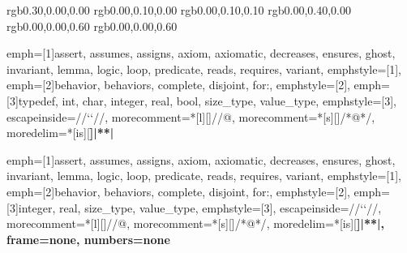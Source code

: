 
\usepackage{courier} 
\usepackage{listings}
\usepackage{color} 


\makeatletter
\renewcommand\lstinline[1][]{%
  \leavevmode\bgroup %
  \def\lst@boxpos{b}%
  \lsthk@PreSet\lstset{flexiblecolumns,#1}%
  \lsthk@TextStyle
  \ifnum\iffalse{\fi`}=\z@\fi
  \@ifnextchar\bgroup{%
  \ifnum`{=\z@}\fi%
  \afterassignment\lst@InlineG \let\@let@token}{%
  \ifnum`{=\z@}\fi\lstinline@}}
\makeatother

% 1.3.10 jb:
% commented-out unused colors and styles,
% changed color names to logical ones

%\definecolor{darkred}		{rgb}{0.60,0.00,0.00}
\definecolor{coACSLBehavior}	{rgb}{0.30,0.00,0.00}
\definecolor{coASCL}		{rgb}{0.00,0.10,0.00}
\definecolor{coASCLKeyword}	{rgb}{0.00,0.10,0.10}
\definecolor{darkgreen}		{rgb}{0.00,0.40,0.00}
\definecolor{darkblue}		{rgb}{0.00,0.00,0.60}
\definecolor{coCKeyword}	{rgb}{0.00,0.00,0.60}
%\definecolor{red}		{rgb}{0.98,0.00,0.00}
%\definecolor{lightblue}        {rgb}{0.60,0.80,1.00}
%\definecolor{lightred}		{rgb}{1.00,0.60,0.60}

{
  emph=[1]{assert, assumes, assigns, axiom, axiomatic, decreases, ensures,
                 ghost, invariant, lemma, logic, loop, predicate,
		 reads, requires, variant},
  emphstyle=[1]{\bfseries\color{coASCLKeyword}},
  emph=[2]{behavior, behaviors, complete, disjoint, for:},
  emphstyle=[2]{\bfseries\color{coACSLBehavior}},
  emph=[3]{typedef, int, char, integer, real, bool, size_type, value_type},
  emphstyle=[3]{\bfseries\color{coCKeyword}},
  escapeinside={//`}{`//},
  morecomment=*[l][\color{coASCL}]{//@},
  morecomment=*[s][\color{coASCL}]{/*@}{*/},
  moredelim=*[is][\bfseries]{|*}{*|}
  }

{
  emph=[1]{assert, assumes, assigns, axiom, axiomatic, decreases, ensures,
                 ghost, invariant, lemma, logic, loop, predicate,
		 reads, requires, variant},
  emphstyle=[1]{\bfseries\color{coASCLKeyword}},
  emph=[2]{behavior, behaviors, complete, disjoint, for:},
  emphstyle=[2]{\bfseries\color{coACSLBehavior}},
  emph=[3]{integer, real, size_type, value_type},
  emphstyle=[3]{\bfseries\color{coCKeyword}},
  escapeinside={//`}{`//},
  morecomment=*[l][\color{coASCL}]{//@},
  morecomment=*[s][\color{coASCL}]{/*@}{*/},
  moredelim=*[is][\bfseries]{|*}{*|},
     frame=none,
     numbers=none
}

